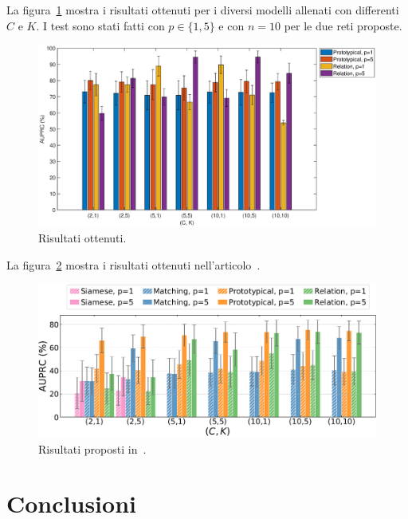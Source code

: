 \documentclass[12pt,a4paper,titlepage]{article}
\begin{document}
La figura~\ref{fig:results} mostra i risultati ottenuti per i diversi modelli allenati con differenti $C$ e $K$. I test sono stati fatti con $p \in \{1, 5\}$ e con $n = 10$ per le due reti proposte. 
\begin{figure}[h]
	\centering	
	\includegraphics[width=1\textwidth]{Immagini/results}
	\caption{Risultati ottenuti.}
	\label{fig:results}
\end{figure}

La figura~\ref{fig:results_paper} mostra i risultati ottenuti nell'articolo~\cite{Salamon:Few-Shot}.
\begin{figure}[h]
	\centering	
	\includegraphics[width=1\textwidth]{Immagini/results_paper}
	\caption{Risultati proposti in~\cite{Salamon:Few-Shot}.}
	\label{fig:results_paper}
\end{figure}
\clearpage

\section{Conclusioni}
\label{sec:conclusioni}
\clearpage

\nocite{*}
\printbibliography
\end{document}
